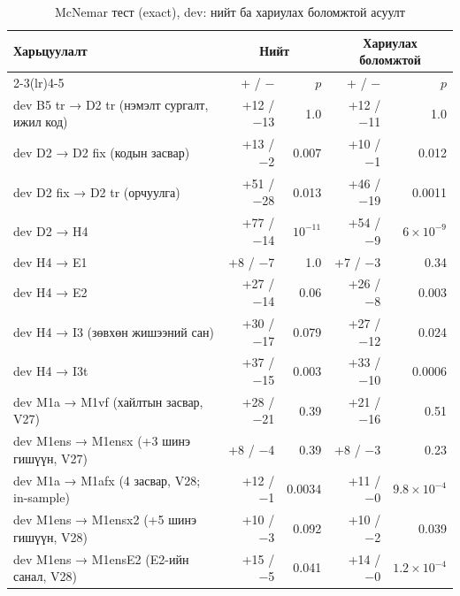 \begin{table}[H]
\centering\small
\caption{McNemar тест (exact), dev: нийт ба хариулах боломжтой асуулт}
\label{tab:mcnemar-dev}
\begin{tabularx}{\textwidth}{X r r r r}
\toprule
Харьцуулалт & \multicolumn{2}{c}{Нийт} & \multicolumn{2}{c}{Хариулах боломжтой} \\
\cmidrule(lr){2-3}\cmidrule(lr){4-5}
 & + / − & $p$ & + / − & $p$ \\
\midrule
dev B5 tr → D2 tr (нэмэлт сургалт, ижил код) & +12 / −13 & 1.0 & +12 / −11 & 1.0 \\
dev D2 → D2 fix (кодын засвар) & +13 / −2 & 0.007 & +10 / −1 & 0.012 \\
dev D2 fix → D2 tr (орчуулга) & +51 / −28 & 0.013 & +46 / −19 & 0.0011 \\
dev D2 → H4 & +77 / −14 & $10^{-11}$ & +54 / −9 & $6 \times 10^{-9}$ \\
dev H4 → E1 & +8 / −7 & 1.0 & +7 / −3 & 0.34 \\
dev H4 → E2 & +27 / −14 & 0.06 & +26 / −8 & 0.003 \\
dev H4 → I3 (зөвхөн жишээний сан) & +30 / −17 & 0.079 & +27 / −12 & 0.024 \\
dev H4 → I3t & +37 / −15 & 0.003 & +33 / −10 & 0.0006 \\
dev M1a → M1vf (хайлтын засвар, V27) & +28 / −21 & 0.39 & +21 / −16 & 0.51 \\
dev M1ens → M1ensx (+3 шинэ гишүүн, V27) & +8 / −4 & 0.39 & +8 / −3 & 0.23 \\
dev M1a → M1afx (4 засвар, V28; in-sample) & +12 / −1 & 0.0034 & +11 / −0 & $9.8 \times 10^{-4}$ \\
dev M1ens → M1ensx2 (+5 шинэ гишүүн, V28) & +10 / −3 & 0.092 & +10 / −2 & 0.039 \\
dev M1ens → M1ensE2 (E2-ийн санал, V28) & +15 / −5 & 0.041 & +14 / −0 & $1.2 \times 10^{-4}$ \\
\bottomrule
\end{tabularx}
\end{table}

